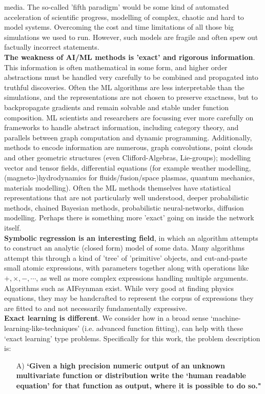 \documentclass{article}
\begin{document}
media. The so-called 'fifth paradigm' would be some kind of automated acceleration of scientific progress, modelling of complex, chaotic and hard to model systems. Overcoming the cost and time limitations of all those big simulations we used to run. However, such models are fragile and often spew out factually incorrect statements. \\ \textbf{The weakness of AI/ML methods is 'exact' and rigorous information}. This information is often mathematical in some form, and higher order abstractions must be handled very carefully to be combined and propagated into truthful discoveries. Often the ML algorithms are less interpretable than the simulations, and the representations are not chosen to preserve exactness, but to backpropagate gradients and remain solvable and stable under function composition. ML scientists and researchers are focussing ever more carefully on frameworks to handle abstract information, including category theory, and parallels between graph computation and dynamic programming. Additionally, methods to encode information are numerous, graph convolutions, point clouds and other geometric structures (even Clifford-Algebras, Lie-groups); modelling vector and tensor fields, differential equations (for example weather modelling, (magneto-)hydrodynamics for fluids/fusion/space plasmas, quantum mechanics, materials modelling). Often the ML methods themselves have statistical representations that are not particularly well understood, deeper probabilistic methods, chained Bayesian methods, probabilistic neural-networks, diffusion modelling. Perhaps there is something more 'exact' going on inside the network itself.  \\ \textbf{Symbolic regression is an interesting field}, in which an algorithm attempts to construct an analytic (closed form) model of some data. Many algorithms attempt this through a kind of 'tree' of 'primitive' objects, and cut-and-paste small atomic expressions, with parameters together along with operations like $+, \times, -, \cdots$, as well as more complex expressions handling multiple arguments. Algorithms such as AIFeynman exist. While very good at finding physics equations, they may be handcrafted to represent the corpus of expressions they are fitted to and not necessarily fundamentally expressive. \\ \textbf{Exact learning is different}. We consider how in a broad sense `machine-learning-like-techniques' (i.e. advanced function fitting), can help with these `exact learning' type problems. Specifically for this work, the problem description is: 
\begin{enumerate}
\item[A)] \textbf{`Given a high precision numeric output of an unknown multivariate function or distribution write the `human readable equation' for that function as output, where it is possible to do so."}
\end{enumerate}
\end{document}
